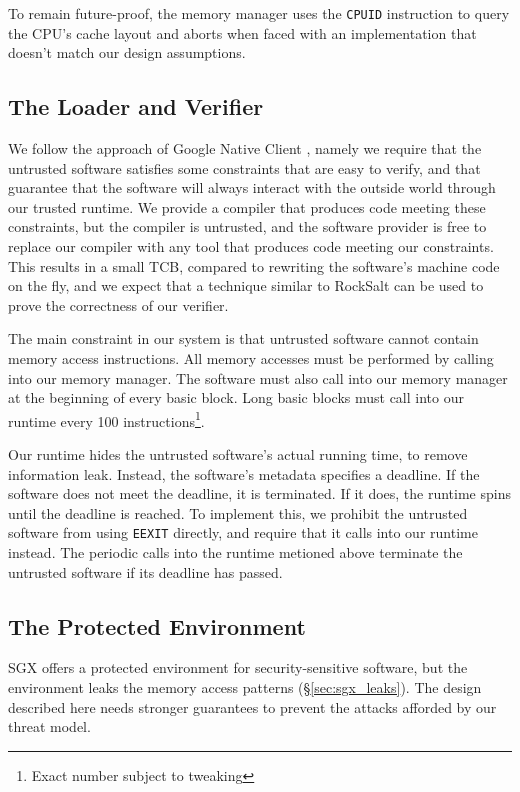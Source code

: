 To remain future-proof, the memory manager uses the \texttt{CPUID} instruction
\cite{intel2013manual} to query the CPU's cache layout and aborts when faced
with an implementation that doesn't match our design assumptions.


\subsection{The Loader and Verifier}
\label{sec:loader_verifier}

We follow the approach of Google Native Client \cite{yee2009native}
\cite{sehr2010adapting}, namely we require that the untrusted software
satisfies some constraints that are easy to verify, and that guarantee that the
software will always interact with the outside world through our trusted
runtime. We provide a compiler that produces code meeting these constraints,
but the compiler is untrusted, and the software provider is free to replace our
compiler with any tool that produces code meeting our constraints. This results
in a small TCB, compared to rewriting the software's machine code on the fly,
and we expect that a technique similar to RockSalt \cite{morrisett2012rocksalt}
can be used to prove the correctness of our verifier.

The main constraint in our system is that untrusted software cannot contain
memory access instructions. All memory accesses must be performed by calling
into our memory manager. The software must also call into our memory manager
at the beginning of every basic block. Long basic blocks must call into our
runtime every 100 instructions\footnote{Exact number subject to tweaking}.

Our runtime hides the untrusted software's actual running time, to remove
information leak. Instead, the software's metadata specifies a deadline.
If the software does not meet the deadline, it is terminated. If it does, the
runtime spins until the deadline is reached. To implement this, we prohibit the
untrusted software from using \texttt{EEXIT} directly, and require that it
calls into our runtime instead. The periodic calls into the runtime metioned
above terminate the untrusted software if its deadline has passed.


\subsection{The Protected Environment}
\label{sec:protected_environment}

SGX offers a protected environment for security-sensitive software, but the
environment leaks the memory access patterns (\S \ref{sec:sgx_leaks}). The
design described here needs stronger guarantees to prevent the attacks afforded
by our threat model.

